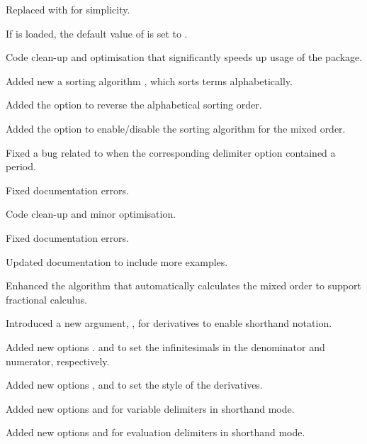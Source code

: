\begin{changelog}
\begin{change}[version=1.1, date=2021-06-03, beta=false]
		\item Replaced  with  for simplicity.
		\item If  is loaded, the default value of  is set to .
	\end{change}
	\begin{change}[version=1.2, date=2022-07-09, beta=false]
		\item Code clean-up and optimisation that significantly speeds up usage of the package.
		\item Added new a sorting algorithm , which sorts terms alphabetically.
		\item Added the option  to reverse the alphabetical sorting order.
		\item Added the option  to enable/disable the sorting algorithm for the mixed order.
		\item Fixed a bug related to  when the corresponding delimiter option contained a period.
		\item Fixed documentation errors.
	\end{change}
	\begin{change}[version=1.3, date=2023-07-26, beta=false]
		\item Code clean-up and minor optimisation.
		\item Fixed documentation errors.
		\item Updated documentation to include more examples.
		\item Enhanced the algorithm that automatically calculates the mixed order to support fractional calculus.
		\item Introduced a new argument, \targ{!}, for derivatives to enable shorthand notation.
		\item Added new options .
		and  to set the infinitesimals in the denominator and numerator, respectively.
		\item Added new options ,  and  to set the style of the derivatives.
		\item Added new options  and  for variable delimiters in shorthand mode.
		\item Added new options  and  for evaluation delimiters in shorthand mode.
	\end{change}
\end{changelog}

	
